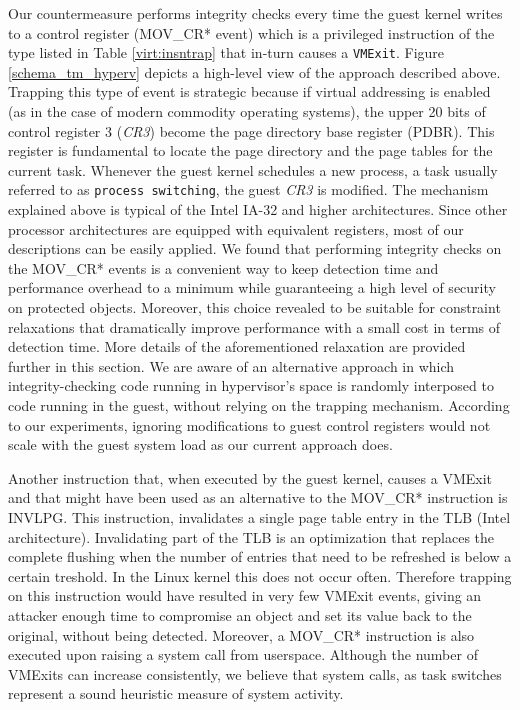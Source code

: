 Our countermeasure performs integrity checks every time the guest kernel writes to a control register (MOV\_CR* event) which is a privileged instruction of the type listed in Table \ref{virt:insntrap} that in-turn causes a \texttt{VMExit}. 
Figure \ref{schema_tm_hyperv} depicts a high-level view of the approach described above. 
Trapping this type of event is strategic because if virtual addressing is enabled (as in the case of modern commodity operating systems), the upper 20 bits of control register 3 (\emph{CR3}) become the page directory base register (PDBR). This register is fundamental to locate the page directory and the page tables for the current task. Whenever the guest kernel schedules a new process, a task usually referred to as \texttt{process switching}, the guest \emph{CR3} is modified. 
The mechanism explained above is typical of the Intel IA-32 and higher architectures. Since other processor architectures are equipped with equivalent registers, most of our descriptions can be easily applied. 
We found that performing integrity checks on the MOV\_CR* events is a convenient way to keep detection time and performance overhead to a minimum while guaranteeing a high level of security on protected objects. 
Moreover, this choice revealed to be suitable for constraint relaxations that dramatically improve performance with a small cost in terms of detection time. More details of the aforementioned relaxation are provided further in this section. 
We are aware of an alternative approach in which integrity-checking code running in hypervisor's space is randomly interposed to code running in the guest, without relying on the trapping mechanism. According to our experiments, ignoring modifications to guest control registers would not scale with the guest system load as our current approach does.

Another instruction that, when executed by the guest kernel, causes a VMExit and that might have been used as an alternative to the MOV\_CR* instruction is INVLPG. This instruction, invalidates a single page table entry in the TLB (Intel architecture). Invalidating part of the TLB is an optimization that replaces the complete flushing when the number of entries that need to be refreshed is below a certain treshold. 
In the Linux kernel this does not occur often. Therefore trapping on this instruction would have resulted in very few VMExit events, giving an attacker enough time to compromise an object and set its value back to the original, without being detected. Moreover, a MOV\_CR* instruction is also executed upon raising a system call from userspace. Although the number of VMExits can increase consistently, we believe that system calls, as task switches represent a sound heuristic measure of system activity.



